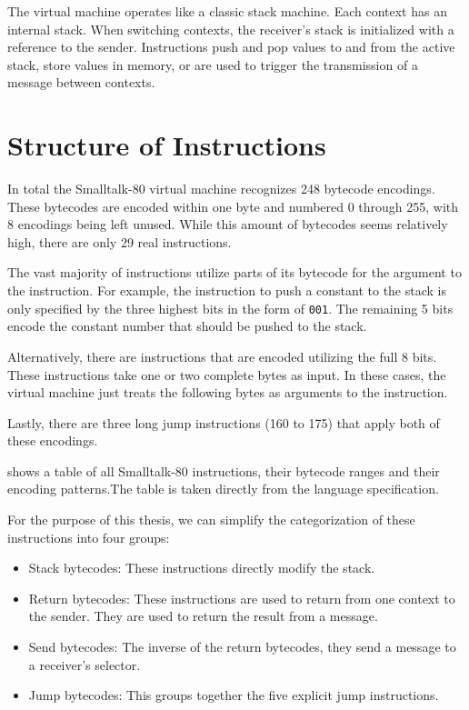 
The virtual machine operates like a classic stack machine. Each context has an internal stack. When switching contexts, the receiver's stack is initialized with a reference to the sender. Instructions push and pop values to and from the active stack, store values in memory, or are used to trigger the transmission of a message between contexts. 

\section{Structure of Instructions}
In total the Smalltalk-80 virtual machine recognizes 248 bytecode encodings. These bytecodes are encoded within one byte and numbered 0 through 255, with 8 encodings being left unused. 
While this amount of bytecodes seems relatively high, there are only 29 real instructions. 

The vast majority of instructions utilize parts of its bytecode for the argument to the instruction. For example, the instruction to push a constant to the stack is only specified by the three highest bits in the form of \texttt{001}. The remaining 5 bits encode the constant number that should be pushed to the stack. 

Alternatively, there are instructions that are encoded utilizing the full 8 bits. These instructions take one or two complete bytes as input. In these cases, the virtual machine just treats the following bytes as arguments to the instruction. 

Lastly, there are three long jump instructions (160 to 175) that apply both of these encodings.

 shows a table of all Smalltalk-80 instructions, their bytecode ranges and their encoding patterns.The table is taken directly from the language specification.


For the purpose of this thesis, we can simplify the categorization of these instructions into four groups: 
\begin{itemize}
  \item Stack bytecodes: These instructions directly modify the stack. 
  \item Return bytecodes: These instructions are used to return from one context to the sender. They are used to return the result from a message. 
  \item Send bytecodes: The inverse of the return bytecodes, they send a message to a receiver's selector.
  \item Jump bytecodes: This groups together the five explicit jump instructions.
\end{itemize}

